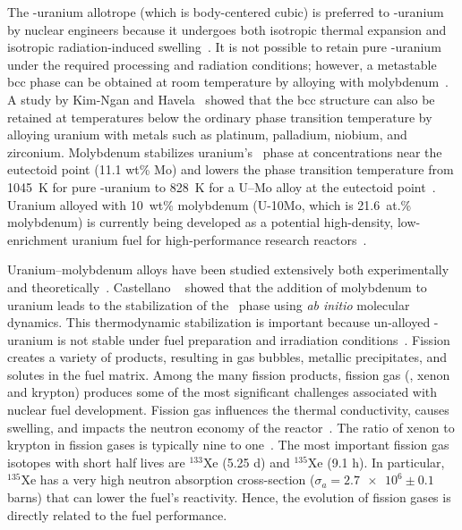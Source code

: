 The \mbox{\textgamma-uranium} allotrope (which is body-centered cubic) is
preferred to \mbox{\textalpha-uranium} by nuclear engineers because it
undergoes both isotropic thermal expansion and isotropic radiation-induced
swelling~\cite{kittel1993history}.
It is not possible to retain pure \mbox{\textgamma-uranium} under the required
processing and radiation conditions;
however, a metastable bcc phase can be obtained at room temperature by alloying
with molybdenum~\cite{wilson1949structures, sinha2010phase,
    yakel1969crystal,sinha2010effect}.
A study by Kim-Ngan and Havela~\cite{kim2016superconductivity} showed that the
bcc structure can also be retained at temperatures below the ordinary phase
transition temperature by alloying uranium with metals such as platinum,
palladium, niobium, and zirconium.
Molybdenum stabilizes uranium's \textgamma\ phase at concentrations near the
eutectoid point (11.1 wt\% Mo) and lowers the phase transition temperature from
1045~K for pure \textgamma-uranium to 828~K for a U--Mo alloy at the eutectoid
point~\cite{ASM-Alloy-Mo,Berche2011}.
Uranium alloyed with 10~wt\% molybdenum (U-10Mo, which is
21.6~at.\% molybdenum) is currently being developed as a potential
high-density, low-enrichment uranium fuel for high-performance research
reactors~\cite{prabhakaran2017u, meyer2014irradiation, williams2017post}.

Uranium--molybdenum alloys have been studied extensively both
experimentally~\cite{dwight1960uranium,tangri1961metastable, sinha2010phase}
and theoretically~\cite{berche2011calphad,zhang2010thermodynamic,
    losada2019ground, landa2011density,alonso2007role}.
Castellano \etal~\cite{castellano2020thermodynamic} showed that the
addition of molybdenum to uranium leads to the stabilization of the
\textgamma\ phase using \textit{ab initio} molecular dynamics.
This thermodynamic stabilization is important because un-alloyed
\textgamma-uranium is not stable under fuel preparation and irradiation
conditions~\cite{sinha2010phase,sinha2010effect}.
Fission creates a variety of products, resulting in gas bubbles,
metallic precipitates, and solutes in the fuel matrix.
Among the many fission products, fission gas (\ie, xenon and krypton) produces
some of the most significant challenges associated with nuclear fuel
development. Fission gas influences the thermal conductivity,
causes swelling, and impacts the neutron economy of the
reactor~\cite{rondinella2010high,iasir2018estimation}. The ratio of xenon to
krypton in fission gases is typically nine to one~\cite{rest2006u}. The most
important fission gas isotopes with short half lives are $^{133}$Xe (5.25 d)
and $^{135}$Xe (9.1 h). In particular, $^{135}$Xe has a very high neutron
absorption cross-section ($\sigma_a = \num{2.7e6}\pm 0.1$ barns) that can lower
the fuel's reactivity. Hence, the evolution of fission gases is directly
related to the fuel performance. 

